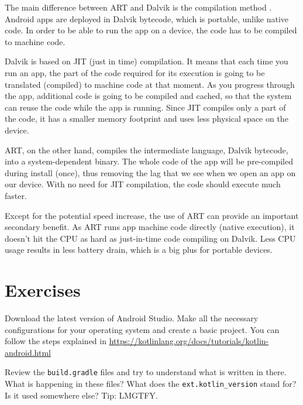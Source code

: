 The main difference between ART and Dalvik is the compilation method \cite{Vitas2013}.
Android apps are deployed in Dalvik bytecode, which is portable, unlike native code.
In order to be able to run the app on a device, the code has to be compiled to machine code.

Dalvik is based on JIT (just in time) compilation.
It means that each time you run an app, the part of the code required for its execution is going to be translated (compiled) to machine code at that moment.
As you progress through the app, additional code is going to be compiled and cached, so that the system can reuse the code while the app is running.
Since JIT compiles only a part of the code, it has a smaller memory footprint and uses less physical space on the device.

ART, on the other hand, compiles the intermediate language, Dalvik bytecode, into a system-dependent binary.
The whole code of the app will be pre-compiled during install (once), thus removing the lag that we see when we open an app on our device.
With no need for JIT compilation, the code should execute much faster.

Except for the potential speed increase, the use of ART can provide an important secondary benefit.
As ART runs app machine code directly (native execution), it doesn't hit the CPU as hard as just-in-time code compiling on Dalvik.
Less CPU usage results in less battery drain, which is a big plus for portable devices.



\section{Exercises}
\begin{exercise}
	Download the latest version of Android Studio.
	Make all the necessary configurations for your operating system and create a basic project.
	You can follow the steps explained in \url{https://kotlinlang.org/docs/tutorials/kotlin-android.html}
\end{exercise}

\begin{exercise}
	Review the \texttt{build.gradle} files and try to understand what is written in there.
	What is happening in these files?
	What does the \texttt{ext.kotlin\_version} stand for?
	Is it used somewhere else? Tip: LMGTFY.
\end{exercise}

